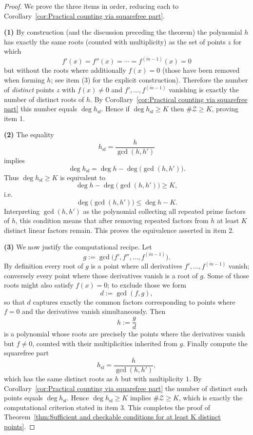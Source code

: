 \documentclass[11pt]{article}
\begin{document}
\begin{proof}

We prove the three items in order, reducing each to Corollary~\ref{cor:Practical counting via squarefree part}.

\medskip\noindent\textbf{(1)} By construction (and the discussion preceding the theorem) the polynomial \(h\) has exactly the same roots (counted with multiplicity) as the set of points \(z\) for which
\[
f'(x)=f''(x)=\cdots=f^{(\acute{m}-1)}(x)=0
\]
but without the roots where additionally \(f(x)=0\) (those have been removed when forming \(h\); see item (3) for the explicit construction). Therefore the number of \emph{distinct} points \(z\) with \(f(x)\neq0\) and \(f',\dots,f^{(\acute{m}-1)}\) vanishing is exactly the number of distinct roots of \(h\). By Corollary~\ref{cor:Practical counting via squarefree part} this number equals \(\deg h_{\mathrm{sf}}\). Hence if \(\deg h_{\mathrm{sf}}\ge K\) then \(\#\mathcal Z\ge K\), proving item 1.

\medskip\noindent\textbf{(2)} The equality
\[
h_{\mathrm{sf}}=\frac{h}{\gcd(h,h')}
\]
implies
\[
\deg h_{\mathrm{sf}}=\deg h-\deg\big(\gcd(h,h')\big).
\]
Thus \(\deg h_{\mathrm{sf}}\ge K\) is equivalent to
\[
\deg h-\deg\big(\gcd(h,h')\big)\ge K,
\]
i.e.
\[
\deg\big(\gcd(h,h')\big)\le \deg h-K.
\]
Interpreting \(\gcd(h,h')\) as the polynomial collecting all repeated prime factors of \(h\), this condition means that after removing repeated factors from \(h\) at least \(K\) distinct linear factors remain. This proves the equivalence asserted in item 2.

\medskip\noindent\textbf{(3)} We now justify the computational recipe. Let
\[
g:=\gcd\big(f',f'',\dots,f^{(\acute{m}-1)}\big).
\]
By definition every root of \(g\) is a point where all derivatives \(f',\dots,f^{(\acute{m}-1)}\) vanish; conversely every point where those derivatives vanish is a root of \(g\). Some of those roots might also satisfy \(f(x)=0\); to exclude those we form
\[
d:=\gcd(f,g),
\]
so that \(d\) captures exactly the common factors corresponding to points where \(f=0\) and the derivatives vanish simultaneously. Then
\[
h:=\frac{g}{d}
\]
is a polynomial whose roots are precisely the points where the derivatives vanish but \(f\neq0\), counted with their multiplicities inherited from \(g\). Finally compute the squarefree part
\[
h_{\mathrm{sf}}=\frac{h}{\gcd(h,h')},
\]
which has the same distinct roots as \(h\) but with multiplicity \(1\). By Corollary~\ref{cor:Practical counting via squarefree part} the number of distinct such points equals \(\deg h_{\mathrm{sf}}\). Hence \(\deg h_{\mathrm{sf}}\ge K\) implies \(\#\mathcal Z\ge K\), which is exactly the computational criterion stated in item 3. This completes the proof of Theorem~\ref{thm:Sufficient and checkable conditions for at least K distinct points}.
%
\end{proof}
\end{document}
